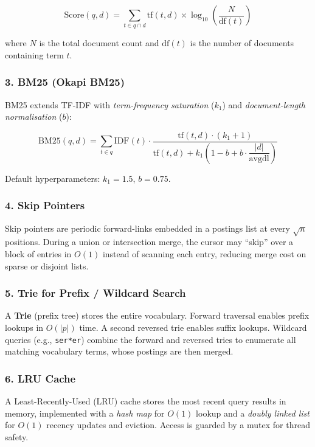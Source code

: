\documentclass[12pt]{article}
\begin{document}
\begin{equation}
\text{Score}(q, d) = \sum_{t \in q \cap d} \mathrm{tf}(t,d) \times \log_{10}\!\left(\frac{N}{\mathrm{df}(t)}\right)
\end{equation}

where $N$ is the total document count and $\mathrm{df}(t)$ is the number of documents containing term $t$.

\subsubsection*{3. BM25 (Okapi BM25)}
BM25 extends TF-IDF with \emph{term-frequency saturation} ($k_1$) and \emph{document-length normalisation} ($b$):

\begin{equation}
\text{BM25}(q, d) = \sum_{t \in q} \mathrm{IDF}(t) \cdot \frac{\mathrm{tf}(t,d)\cdot(k_1+1)}{\mathrm{tf}(t,d) + k_1\!\left(1 - b + b\cdot\dfrac{|d|}{\mathrm{avgdl}}\right)}
\end{equation}

Default hyperparameters: $k_1 = 1.5$, $b = 0.75$.

\subsubsection*{4. Skip Pointers}
Skip pointers are periodic forward-links embedded in a postings list at every $\sqrt{n}$ positions. During a union or intersection merge, the cursor may ``skip'' over a block of entries in $O(1)$ instead of scanning each entry, reducing merge cost on sparse or disjoint lists.

\subsubsection*{5. Trie for Prefix / Wildcard Search}
A \textbf{Trie} (prefix tree) stores the entire vocabulary. Forward traversal enables prefix lookups in $O(|p|)$ time. A second reversed trie enables suffix lookups. Wildcard queries (e.g., \texttt{ser*er}) combine the forward and reversed tries to enumerate all matching vocabulary terms, whose postings are then merged.

\subsubsection*{6. LRU Cache}
A Least-Recently-Used (LRU) cache stores the most recent query results in memory, implemented with a \emph{hash map} for $O(1)$ lookup and a \emph{doubly linked list} for $O(1)$ recency updates and eviction. Access is guarded by a mutex for thread safety.
\end{document}
